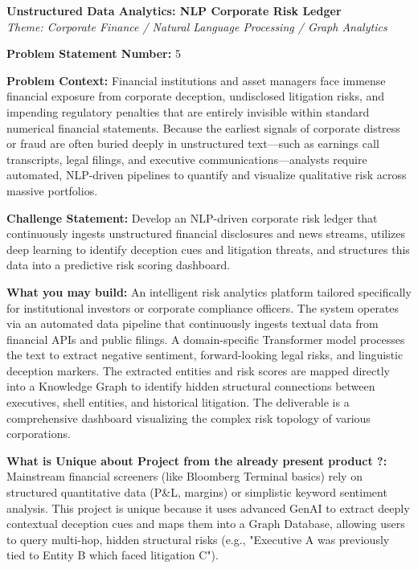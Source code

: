 \documentclass[11pt, a4paper]{article}
\begin{document}
\begin{center}
    \Large\textbf{Unstructured Data Analytics: NLP Corporate Risk Ledger} \\
    \normalsize\textit{Theme: Corporate Finance / Natural Language Processing / Graph Analytics}
\end{center}
\vspace{0.8cm}

\noindent\textbf{Problem Statement Number:} 5

\vspace{0.4cm}
\noindent\textbf{Problem Context:} Financial institutions and asset managers face immense financial exposure from corporate deception, undisclosed litigation risks, and impending regulatory penalties that are entirely invisible within standard numerical financial statements. Because the earliest signals of corporate distress or fraud are often buried deeply in unstructured text—such as earnings call transcripts, legal filings, and executive communications—analysts require automated, NLP-driven pipelines to quantify and visualize qualitative risk across massive portfolios.

\vspace{0.4cm}
\noindent\textbf{Challenge Statement:} Develop an NLP-driven corporate risk ledger that continuously ingests unstructured financial disclosures and news streams, utilizes deep learning to identify deception cues and litigation threats, and structures this data into a predictive risk scoring dashboard.

\vspace{0.4cm}
\noindent\textbf{What you may build:} An intelligent risk analytics platform tailored specifically for institutional investors or corporate compliance officers. The system operates via an automated data pipeline that continuously ingests textual data from financial APIs and public filings. A domain-specific Transformer model processes the text to extract negative sentiment, forward-looking legal risks, and linguistic deception markers. The extracted entities and risk scores are mapped directly into a Knowledge Graph to identify hidden structural connections between executives, shell entities, and historical litigation. The deliverable is a comprehensive dashboard visualizing the complex risk topology of various corporations.

\vspace{0.4cm}
\noindent\textbf{What is Unique about Project from the already present product ?:} Mainstream financial screeners (like Bloomberg Terminal basics) rely on structured quantitative data (P\&L, margins) or simplistic keyword sentiment analysis. This project is unique because it uses advanced GenAI to extract deeply contextual deception cues and maps them into a Graph Database, allowing users to query multi-hop, hidden structural risks (e.g., "Executive A was previously tied to Entity B which faced litigation C").
\end{document}
